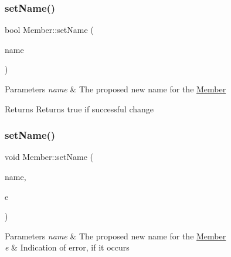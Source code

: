 \subsubsection{\texorpdfstring{set\+Name()}{setName()}\hspace{0.1cm}{\footnotesize\ttfamily [1/2]}}
{\footnotesize\ttfamily bool Member\+::set\+Name (\begin{DoxyParamCaption}\item[{const \hyperlink{namespaceshaan97_1_1sync_af59c2c9185f7cde547b79fbe0bf8ec71}{Member\+Name} \&}]{name }\end{DoxyParamCaption})}


\begin{DoxyParams}{Parameters}
{\em name} & The proposed new name for the {\ttfamily \hyperlink{classshaan97_1_1sync_1_1_member}{Member}} \\
\hline
\end{DoxyParams}
\begin{DoxyReturn}{Returns}
Returns true if successful change 
\end{DoxyReturn}
\mbox{\label{classshaan97_1_1sync_1_1_member_acf773707b31068738756d9afabe39aea}} 
\subsubsection{\texorpdfstring{set\+Name()}{setName()}\hspace{0.1cm}{\footnotesize\ttfamily [2/2]}}
{\footnotesize\ttfamily void Member\+::set\+Name (\begin{DoxyParamCaption}\item[{const \hyperlink{namespaceshaan97_1_1sync_af59c2c9185f7cde547b79fbe0bf8ec71}{Member\+Name} \&}]{name,  }\item[{\hyperlink{classshaan97_1_1sync_1_1_error}{Error} \&}]{e }\end{DoxyParamCaption})}


\begin{DoxyParams}{Parameters}
{\em name} & The proposed new name for the {\ttfamily \hyperlink{classshaan97_1_1sync_1_1_member}{Member}} \\
\hline
{\em e} & Indication of error, if it occurs \\
\hline
\end{DoxyParams}
\mbox{\label{classshaan97_1_1sync_1_1_member_a94b2fe3391cadf9f0ac713fab86c792c}} 

